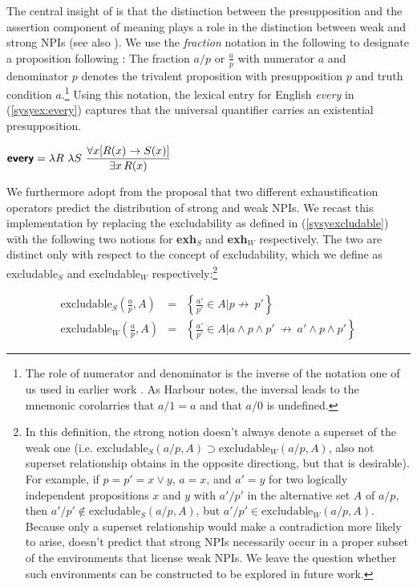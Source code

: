 \documentclass[output=paper,colorlinks,citecolor=brown,
]{langscibook}
\let\l\lambda
\def\refp#1{(\ref{sy#1})}
\def\existsx{\ifmmode\mathop{\exists x}\else$\exists x$\xspace\fi}
\def\forallx{\ifmmode\mathop{\forall x}\else$\forall x$\xspace\fi}
\begin{document}
The central insight of \cite{gajewski11a} is that the distinction between the presupposition and the assertion component of meaning plays a role in the distinction between weak and strong NPIs (see also \citealt{homer08h}).
We use the \emph{fraction} notation in the following to designate a proposition  following \cite{harbour14a}: The fraction $a/p$ or $\scriptstyle\frac{a}{p}$ with numerator $a$ and denominator $p$ denotes the trivalent proposition with presupposition $p$ and truth condition $a$.\footnote{The role of numerator and denominator is the inverse of the notation one of us used in earlier work \citep{sauerland05f}. As Harbour notes, the inversal leads to the mnemonic corolarries that $a/1 = a$ and that $a/0$ is undefined.} Using this notation, the lexical entry for English \emph{every} in \refp{syex:every} captures that the universal quantifier carries an existential presupposition.

\ea \label{syex:every}
$\displaystyle \textsb{every} = \l R\ \l S\ \frac{\forallx [R(x) \rightarrow S(x)]}{\existsx R(x)}$\z

We furthermore adopt from \cite{chierchia13a} the proposal that two different exhaustification operators predict the distribution of strong and weak NPIs.
We recast this implementation by replacing the excludability as defined in \refp{syexcludable} with the following two notions for \textbf{exh}$_{S}$ and \textbf{exh}$_W$ respectively.
The two are distinct only with respect to the concept of excludability, which we define as excludable$_S$ and excludable$_W$ respectively:\footnote{In this definition, the strong notion doesn't always denote a superset of the weak one (i.e. $\text{excludable}_S(a/p,A) \supset \text{excludable}_W(a/p,A)$, also not superset relationship obtains in the opposite directiong, but that is desirable). For example, if $p = p' = x \lor y$, $a = x$, and $a' = y$ for two logically independent propositions $x$ and $y$ with $a'/p'$ in the alternative set $A$ of $a/p$,  then
$a'/p' \not\in \text{excludable}_S(a/p,A)$, but  $a'/p' \in \text{excludable}_W(a/p,A)$. Because only a superset relationship would make a contradiction more likely to arise, \cite{chierchia13a} doesn't predict that strong NPIs necessarily occur in a proper subset of the environments that license weak NPIs. 
We leave the question whether such environments can be constructed to be explored in future work.}

\begin{eqnarray*}
\text{excludable}_S\left(\frac{a}{p},A\right) &=& \left\{\frac{a'}{p'} \in A \mathrel{\Big|}  p  \not\rightarrow\ p'\right\}\\[1ex]
\text{excludable}_W\left(\frac{a}{p},A\right) &=& \left\{\frac{a'}{p'} \in A \mathrel{\Big|}  a \land p \land p' \  \not\rightarrow\ a' \land p \land p'\right\}
\end{eqnarray*}
\end{document}

